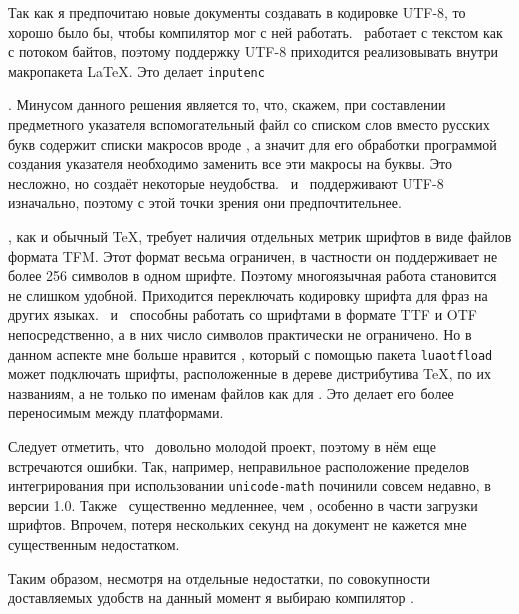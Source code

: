 \documentclass[a4paper,12pt,hyphens]{article}
\newcommand\package[1]{\texttt{#1}}
\newcommand\lcmd[1]{\texttt{#1}}
\begin{document}
Так как я предпочитаю новые документы создавать в кодировке UTF-8, то хорошо было
бы, чтобы компилятор мог с ней работать. \pdfTeX\ работает с текстом как с потоком
байтов, поэтому поддержку UTF-8 приходится реализовывать внутри макропакета \LaTeX.
Это делает \package{inputenc}
\begin{otherlanguage}{english}\parencite{ctan-inputenc,se-inputenc}\end{otherlanguage}.
Минусом данного решения является то, что, скажем,
при составлении предметного указателя вспомогательный файл со списком слов
вместо русских букв содержит списки макросов вроде \lcmd{\IeC {\cyro }},
а значит для его обработки программой создания указателя необходимо заменить
все эти макросы на буквы. Это несложно, но создаёт некоторые неудобства.
\XeTeX\ и \LuaTeX\ поддерживают UTF-8 изначально, поэтому с этой точки зрения
они предпочтительнее.

\pdfTeX, как и обычный \TeX, требует наличия отдельных метрик шрифтов в виде
файлов формата TFM. Этот формат весьма ограничен, в частности он поддерживает не
более 256 символов в одном шрифте. Поэтому многоязычная работа становится не
слишком удобной. Приходится переключать кодировку шрифта для фраз на других
языках. \XeTeX\ и \LuaTeX\ способны работать со шрифтами в формате TTF и OTF
непосредственно, а в них число символов практически не ограничено. Но в
данном аспекте мне больше нравится \LuaTeX, который с помощью пакета
\package{luaotfload} \parencite{ctan-luaotfload} может подключать шрифты, расположенные в дереве
дистрибутива \TeX, по их названиям, а не только по
именам файлов как для \XeTeX. Это делает его более переносимым между
платформами.

Следует отметить, что \LuaTeX\ довольно молодой проект, поэтому в нём еще
встречаются ошибки. Так, например, неправильное расположение пределов
интегрирования при использовании \package{unicode-math} починили совсем недавно,
в версии 1.0. Также \LuaTeX\ существенно медленнее, чем \pdfTeX, особенно в части
загрузки шрифтов. Впрочем, потеря нескольких секунд на документ не кажется мне
существенным недостатком.

Таким образом, несмотря на отдельные недостатки, по совокупности доставляемых
удобств на данный момент я выбираю компилятор \LuaTeX.
\end{document}
